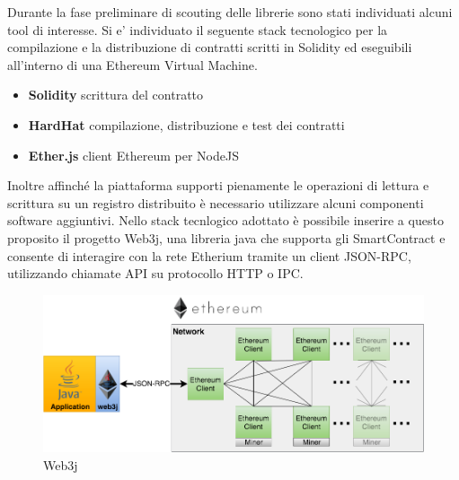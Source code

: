 \documentclass[a4paper,11pt]{article}
\begin{document}

Durante la fase preliminare di scouting delle librerie sono stati individuati alcuni tool di interesse. Si e' individuato il seguente stack tecnologico per la compilazione e la distribuzione di contratti scritti in Solidity ed eseguibili all'interno di una Ethereum Virtual Machine.

\begin{itemize}
  \item \textbf{Solidity} scrittura del contratto
  \item \textbf{HardHat} compilazione, distribuzione e test dei contratti
  \item \textbf{Ether.js} client Ethereum per NodeJS
\end{itemize}

Inoltre affinché la piattaforma supporti pienamente le operazioni di lettura e scrittura su un registro distribuito è necessario utilizzare alcuni componenti software aggiuntivi. Nello stack tecnlogico adottato è possibile inserire a questo proposito il progetto Web3j, una libreria java che supporta gli SmartContract e consente di interagire con la rete Etherium tramite un client JSON-RPC, utilizzando chiamate API su protocollo HTTP o IPC. \cite{web3jQuickstartWeb3j}

\begin{figure}[H]
  \includegraphics[width=1\linewidth]{img/image-2.png}
  \caption{Web3j \cite{web3jQuickstartWeb3j}}
  \label{fig:web3j}
\end{figure}
\end{document}
